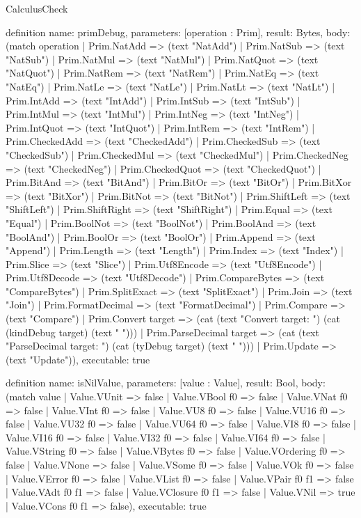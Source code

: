 \begin{lexlean}{CalculusCheck}
\begin{semanticmodule}
definition{
  name: primDebug,
  parameters: [operation : Prim],
  result: Bytes,
  body: (match operation
    | Prim.NatAdd => (text "NatAdd")
    | Prim.NatSub => (text "NatSub")
    | Prim.NatMul => (text "NatMul")
    | Prim.NatQuot => (text "NatQuot")
    | Prim.NatRem => (text "NatRem")
    | Prim.NatEq => (text "NatEq")
    | Prim.NatLe => (text "NatLe")
    | Prim.NatLt => (text "NatLt")
    | Prim.IntAdd => (text "IntAdd")
    | Prim.IntSub => (text "IntSub")
    | Prim.IntMul => (text "IntMul")
    | Prim.IntNeg => (text "IntNeg")
    | Prim.IntQuot => (text "IntQuot")
    | Prim.IntRem => (text "IntRem")
    | Prim.CheckedAdd => (text "CheckedAdd")
    | Prim.CheckedSub => (text "CheckedSub")
    | Prim.CheckedMul => (text "CheckedMul")
    | Prim.CheckedNeg => (text "CheckedNeg")
    | Prim.CheckedQuot => (text "CheckedQuot")
    | Prim.BitAnd => (text "BitAnd")
    | Prim.BitOr => (text "BitOr")
    | Prim.BitXor => (text "BitXor")
    | Prim.BitNot => (text "BitNot")
    | Prim.ShiftLeft => (text "ShiftLeft")
    | Prim.ShiftRight => (text "ShiftRight")
    | Prim.Equal => (text "Equal")
    | Prim.BoolNot => (text "BoolNot")
    | Prim.BoolAnd => (text "BoolAnd")
    | Prim.BoolOr => (text "BoolOr")
    | Prim.Append => (text "Append")
    | Prim.Length => (text "Length")
    | Prim.Index => (text "Index")
    | Prim.Slice => (text "Slice")
    | Prim.Utf8Encode => (text "Utf8Encode")
    | Prim.Utf8Decode => (text "Utf8Decode")
    | Prim.CompareBytes => (text "CompareBytes")
    | Prim.SplitExact => (text "SplitExact")
    | Prim.Join => (text "Join")
    | Prim.FormatDecimal => (text "FormatDecimal")
    | Prim.Compare => (text "Compare")
    | Prim.Convert target => (cat (text "Convert { target: ") (cat (kindDebug target) (text " }")))
    | Prim.ParseDecimal target => (cat (text "ParseDecimal { target: ") (cat (tyDebug target) (text " }")))
    | Prim.Update => (text "Update")),
  executable: true
}

definition{
  name: isNilValue,
  parameters: [value : Value],
  result: Bool,
  body: (match value
    | Value.VUnit => false
    | Value.VBool f0 => false
    | Value.VNat f0 => false
    | Value.VInt f0 => false
    | Value.VU8 f0 => false
    | Value.VU16 f0 => false
    | Value.VU32 f0 => false
    | Value.VU64 f0 => false
    | Value.VI8 f0 => false
    | Value.VI16 f0 => false
    | Value.VI32 f0 => false
    | Value.VI64 f0 => false
    | Value.VString f0 => false
    | Value.VBytes f0 => false
    | Value.VOrdering f0 => false
    | Value.VNone => false
    | Value.VSome f0 => false
    | Value.VOk f0 => false
    | Value.VError f0 => false
    | Value.VList f0 => false
    | Value.VPair f0 f1 => false
    | Value.VAdt f0 f1 => false
    | Value.VClosure f0 f1 => false
    | Value.VNil => true
    | Value.VCons f0 f1 => false),
  executable: true
}


\end{semanticmodule}
\end{lexlean}
